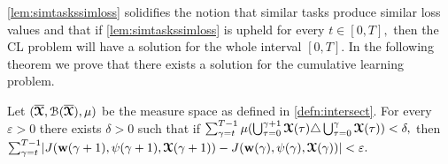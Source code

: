 \cref{lem:simtaskssimloss} solidifies the notion that similar 
tasks produce similar loss values and that if \cref{lem:simtaskssimloss} is upheld for every $t \in [0,T],$ then the CL problem will have a solution for the whole interval $[0,T].$ In the following theorem we prove that there exists a solution for the cumulative learning problem. 


\begin{theorem}\label{thm:contMeasure}
    Let $(\overline{\boldsymbol{\mathcal{X}}},\mathcal{B}(\overline{\boldsymbol{\mathcal{X}}}), \mu)$ be the measure space as defined  in \cref{defn:intersect}. For every $\varepsilon>0$ there exists $\delta >0$ such that if $\sum_{\gamma = t}^{T-1} \mu(\bigcup_{\tau = 0}^{\gamma+1} \boldsymbol{\mathcal{X}}(\tau)\triangle \bigcup_{\tau = 0}^{\gamma} \boldsymbol{\mathcal{X}}(\tau))<\delta,$ then $\sum_{\gamma = t}^{T-1} \lvert J(\boldsymbol{\mathrm{w}}(\gamma+1), \psi(\gamma+1), \boldsymbol{\mathcal{X}}(\gamma+1))-J(\boldsymbol{\mathrm{w}}(\gamma), \psi(\gamma), \boldsymbol{\mathcal{X}}(\gamma)) \rvert <\varepsilon.$
\end{theorem}

